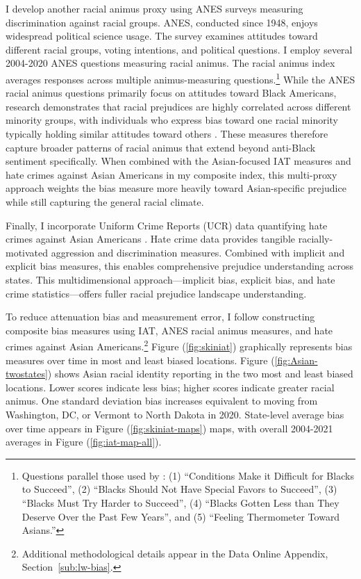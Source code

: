 I develop another racial animus proxy using ANES surveys \autocite{anes2021} measuring discrimination against racial groups. ANES, conducted since 1948, enjoys widespread political science usage. The survey examines attitudes toward different racial groups, voting intentions, and political questions. I employ several 2004-2020 ANES questions measuring racial animus. The racial animus index averages responses across multiple animus-measuring questions.\footnote{Questions parallel those used by \textcite{charlesPrejudiceWagesEmpirical2008}: (1) ``Conditions Make it Difficult for Blacks to Succeed'', (2) ``Blacks Should Not Have Special Favors to Succeed'', (3) ``Blacks Must Try Harder to Succeed'', (4) ``Blacks Gotten Less than They Deserve Over the Past Few Years'', and (5) ``Feeling Thermometer Toward Asians.''} While the ANES racial animus questions primarily focus on attitudes toward Black Americans, research demonstrates that racial prejudices are highly correlated across different minority groups, with individuals who express bias toward one racial minority typically holding similar attitudes toward others \autocite{almasalkhi2023links, mora2020antiblackness}. These measures therefore capture broader patterns of racial animus that extend beyond anti-Black sentiment specifically. When combined with the Asian-focused IAT measures and hate crimes against Asian Americans in my composite index, this multi-proxy approach weights the bias measure more heavily toward Asian-specific prejudice while still capturing the general racial climate.

Finally, I incorporate Uniform Crime Reports (UCR) data quantifying hate crimes against Asian Americans \autocite{ucrbook}. Hate crime data provides tangible racially-motivated aggression and discrimination measures. Combined with implicit and explicit bias measures, this enables comprehensive prejudice understanding across states. This multidimensional approach—implicit bias, explicit bias, and hate crime statistics—offers fuller racial prejudice landscape understanding.

To reduce attenuation bias and measurement error, I follow \textcite{lubotskyInterpretationRegressionsMultiple2006} constructing composite bias measures using IAT, ANES racial animus measures, and hate crimes against Asian Americans.\footnote{Additional methodological details appear in the Data Online Appendix, Section~\ref{sub:lw-bias}.} Figure (\ref{fig:skiniat}) graphically represents bias measures over time in most and least biased locations. Figure (\ref{fig:Asian-twostates}) shows Asian racial identity reporting in the two most and least biased locations. Lower scores indicate less bias; higher scores indicate greater racial animus. One standard deviation bias increases equivalent to moving from Washington, DC, or Vermont to North Dakota in 2020. State-level average bias over time appears in Figure (\ref{fig:skiniat-maps}) maps, with overall 2004-2021 averages in Figure (\ref{fig:iat-map-all}).

